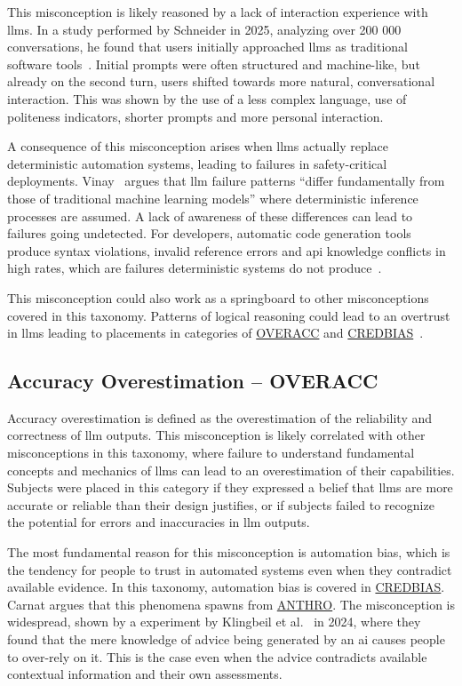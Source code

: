 This misconception is likely reasoned by a lack of interaction experience with \gls{llms}. In a study performed by Schneider in 2025, analyzing over 200 000 conversations, he found that users initially approached \gls{llms} as traditional software tools~\cite{schneider_mental_2025}. Initial prompts were often structured and machine-like, but already on the second turn, users shifted towards more natural, conversational interaction. This was shown by the use of a less complex language, use of politeness indicators, shorter prompts and more personal interaction.

A consequence of this misconception arises when \gls{llms} actually replace deterministic automation systems, leading to failures in safety-critical deployments. Vinay~\cite{vinay_failure_2025} argues that \gls{llm} failure patterns ``differ fundamentally from those of traditional machine learning models'' where deterministic inference processes are assumed. A lack of awareness of these differences can lead to failures going undetected. For developers, automatic code generation tools produce syntax violations, invalid reference errors and \gls{api} knowledge conflicts in high rates, which are failures deterministic systems do not produce~\cite{pavel_hallucination_2025}.

This misconception could also work as a springboard to other misconceptions covered in this taxonomy. Patterns of logical reasoning could lead to an overtrust in \gls{llms} leading to placements in categories of \hyperref[overacc]{OVERACC} and \hyperref[credbias]{CREDBIAS}~\cite{floridi_what_2025, nahar_fakes_2024}.

\subsection{Accuracy Overestimation -- OVERACC}\label{overacc}
Accuracy overestimation is defined as the overestimation of the reliability and correctness of \gls{llm} outputs. This misconception is likely correlated with other misconceptions in this taxonomy, where failure to understand fundamental concepts and mechanics of \gls{llms} can lead to an overestimation of their capabilities. Subjects were placed in this category if they expressed a belief that \gls{llms} are more accurate or reliable than their design justifies, or if subjects failed to recognize the potential for errors and inaccuracies in \gls{llm} outputs.

The most fundamental reason for this misconception is automation bias, which is the tendency for people to trust in automated systems even when they contradict available evidence. In this taxonomy, automation bias is covered in \hyperref[credbias]{CREDBIAS}. Carnat\cite{carnat_human_2024} argues that this phenomena spawns from \hyperref[anthro]{ANTHRO}. The misconception is widespread, shown by a experiment by Klingbeil et al.~\cite{klingbeil_trust_2024} in 2024, where they found that the mere knowledge of advice being generated by an \gls{ai} causes people to over-rely on it. This is the case even when the advice contradicts available contextual information and their own assessments.

